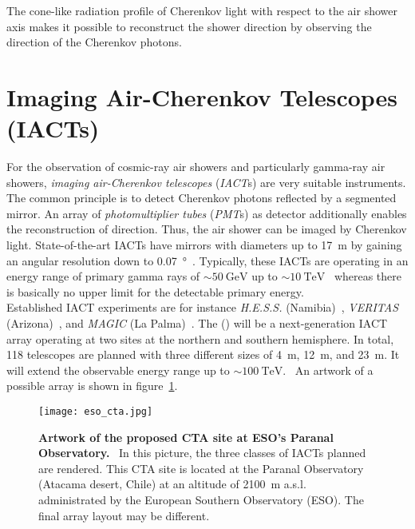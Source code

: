 The cone-like radiation profile of Cherenkov light with respect to the air shower axis makes it possible to reconstruct the shower direction by observing the direction of the Cherenkov photons.

\section{Imaging Air-Cherenkov Telescopes (IACTs)}

For the observation of cosmic-ray air showers and particularly gamma-ray air showers, \textit{imaging air-Cherenkov telescopes} (\textit{IACT}s) are very suitable instruments. The common principle is to detect Cherenkov photons reflected by a segmented mirror. An array of \textit{photomultiplier tubes} (\textit{PMT}s) as detector additionally enables the reconstruction of direction. Thus, the air shower can be imaged by Cherenkov light. State-of-the-art IACTs have mirrors with diameters up to \SI{17}{\meter} by gaining an angular resolution down to \SI{0.07}{\degree}~\cite{iacts:magic}. Typically, these IACTs are operating in an energy range of primary gamma rays of $\sim\SI{50}{\giga\electronvolt}$ up to $\sim\SI{10}{\tera\electronvolt}$~\cite{iacts:magic} whereas there is basically no upper limit for the detectable primary energy.\\

Established IACT experiments are for instance \textit{H.E.S.S.} (Namibia)~\cite{iacts:hess}, \textit{VERITAS} (Arizona)~\cite{iacts:veritas}, and \textit{MAGIC} (La Palma)~\cite{iacts:magic}. The  () will be a next-generation IACT array operating at two sites at the northern and southern hemisphere. In total, \num{118} telescopes are planned with three different sizes of \SI{4}{\meter}, \SI{12}{\meter}, and \SI{23}{\meter}. It will extend the observable energy range up to $\sim\SI{100}{\tera\electronvolt}$.~\cite{iacts:cta} An artwork of a possible array is shown in figure~\ref{cta_artwork}.

\begin{figure}[H]
	\centering
	\texttt{[image: eso\_cta.jpg]}
	\caption[Artwork of the proposed CTA site at ESO's Paranal Observatory]{\textbf{Artwork of the proposed CTA site at ESO's Paranal Observatory.}~\cite{iacts:cta_artwork} In this picture, the three classes of IACTs planned are rendered. This CTA site is located at the Paranal Observatory (Atacama desert, Chile) at an altitude of \SI{2100}{\meter} a.s.l. administrated by the European Southern Observatory (ESO). The final array layout may be different.~\cite{iacts:cta}}
	\label{cta_artwork}
\end{figure}

